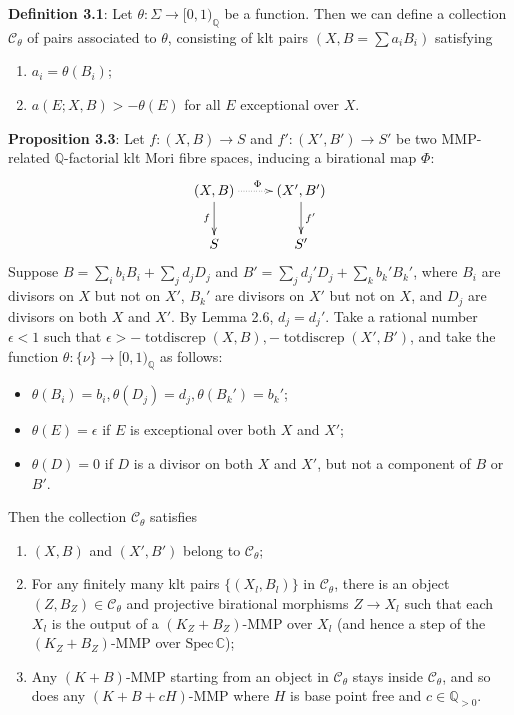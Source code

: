 \documentclass[11pt]{article}
\begin{document}
\begin{itemize}
  
  \textbf{Definition 3.1}:
   Let  $\theta:\Sigma\to [0,1)_\mathbb{Q}$ be a function. Then we can define a collection $ \mathcal{C}_\theta $ of pairs  associated to $ \theta $, consisting of klt pairs $ (X,B=\sum a_iB_i) $ satisfying
  \begin{enumerate}
    \item $ a_i=\theta(B_i) $;
    \item $ a(E;X,B)>-\theta(E) $ for all $ E $ exceptional over $ X $.
  \end{enumerate}
  \textbf{Proposition 3.3}:
  Let $ f:(X,B)\to S$ and $f':(X',B')\to S' $ be two MMP-related $ \mathbb{Q} $-factorial klt Mori fibre spaces, inducing a birational map $\Phi$:
  \[ \xymatrix{
      (X,B)\ar[d]_f\ar@{.>}[r]^\Phi&(X',B')\ar[d]^{f'}\\
      S&S'} \]
  Suppose  $ B=\sum_ib_iB_i+\sum_jd_jD_j $ and $ B'=\sum_jd_j'D_j+\sum_kb_k'B_k' $, where $ B_i $ are divisors on $ X $ but not on $ X' $, $ B_k' $ are divisors on $ X' $ but not on $ X $, and $ D_j $ are divisors on both $ X $ and $ X' $. By Lemma 2.6, $ d_j=d_j' $. Take a rational number $ \epsilon < 1 $ such that $ \epsilon> -\operatorname{totdiscrep}(X,B),-\operatorname{totdiscrep}(X',B') $, and take the function $ \theta:\{\nu\}\to [0,1)_\mathbb{Q} $ as follows:
  \begin{itemize}
    \item $ \theta(B_i)=b_i, \theta(D_j)=d_j,\theta(B_k')=b_k'$;
    \item $ \theta(E)=\epsilon $ if $ E $ is exceptional over both $ X $ and $ X' $;
    \item $ \theta(D)=0 $ if $ D $ is a divisor on both $ X $ and $ X' $, but not a component of $ B $ or $ B' $.
  \end{itemize}
  Then the collection $ \mathcal{C}_\theta $ satisfies
  \begin{enumerate}
    \item $ (X,B) $ and $ (X',B') $ belong to $ \mathcal{C}_\theta $;
    \item For any finitely many klt pairs $ \{(X_l,B_l)\} $ in $ \mathcal{C}_\theta $, there is an object $ (Z,B_Z)\in \mathcal{C}_\theta $ and projective birational morphisms $ Z\to X_l $ such that each $X_l$ is the output of a  $ (K_{Z}+B_{Z}) $-MMP over $ X_l $ (and hence a step of the $(K_Z+B_Z)$-MMP over $ \mathrm{Spec}\,\mathbb{C} $);
    \item Any $ (K+B) $-MMP starting from an object in $ \mathcal{C}_\theta $ stays inside $ \mathcal{C}_\theta $, and so does any $ (K+B+cH) $-MMP where $ H $ is base point free and $ c\in \mathbb{Q}_{>0} $.
  \end{enumerate}
  

\end{itemize}
\end{document}
